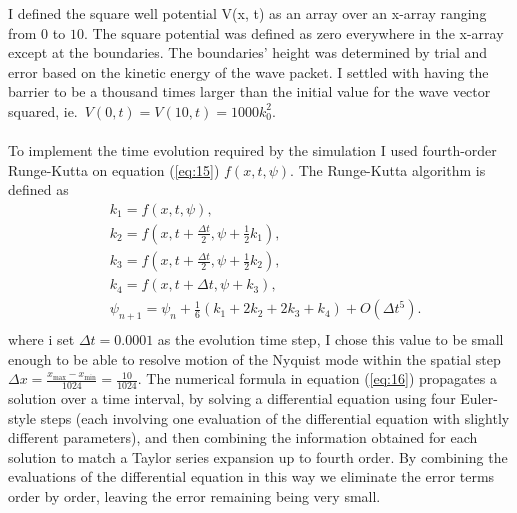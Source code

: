 \documentclass[10pt, a4paper, singlespacing]{report}
\begin{document}
I defined the square well potential V(x, t) as an array over an x-array ranging from $0$ to $10$. The square potential was defined as zero everywhere in the x-array except at the boundaries. The boundaries' height was determined by trial and error based on the kinetic energy of the wave packet. I settled with having the barrier to be a thousand times larger than the initial value for the wave vector squared, \mbox{ie. $V(0, t) = V(10, t) = 1000k_0^2$}.\\\\
To implement the time evolution required by the simulation I used fourth-order Runge-Kutta on equation (\ref{eq:15}) $f(x, t, \psi)$. The Runge-Kutta algorithm is defined as
\begin{equation} \label{eq:16}
\begin{split}
&k_1 = f(x, t, \psi),\\
&k_2 = f(x, t + \frac{\Delta t}{2}, \psi + \frac{1}{2}k_1),\\
&k_3 = f(x, t + \frac{\Delta t}{2}, \psi + \frac{1}{2}k_2),\\
&k_4 = f(x, t + \Delta t, \psi + k_3),\\
&\psi_{n + 1} = \psi_{n} + \frac{1}{6}(k_1 + 2k_2 + 2k_3 + k_4) + O(\Delta t^5).\\
\end{split}
\end{equation}
where i set $\Delta t = 0.0001$ as the evolution time step, I chose this value to be small enough to be able to resolve motion of the Nyquist mode within the spatial step 
$\Delta x = \frac{x_{\mathrm{max}} - x_{\mathrm{min}}}{1024} = \frac{10}{1024}$.
The numerical formula in equation (\ref{eq:16}) propagates a solution over a time interval, by solving a differential equation using four Euler-style steps (each involving one evaluation of the differential equation with slightly different parameters), and then combining the information obtained for each solution to match a Taylor series expansion up to fourth order. By combining the evaluations of the differential equation in this way we eliminate the error terms order by order, leaving the error remaining being very small\cite{N_R}.
\end{document}
